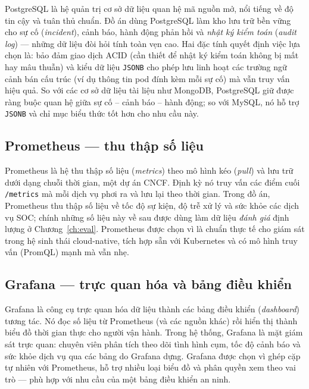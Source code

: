 PostgreSQL là hệ quản trị cơ sở dữ liệu quan hệ mã nguồn mở, nổi tiếng về độ tin cậy và
tuân thủ chuẩn. Đồ án dùng PostgreSQL làm kho lưu trữ bền vững cho sự cố
(\textit{incident}), cảnh báo, hành động phản hồi và \emph{nhật ký kiểm toán}
(\textit{audit log}) --- những dữ liệu đòi hỏi tính toàn vẹn cao. Hai đặc tính quyết định
việc lựa chọn là: bảo đảm giao dịch ACID (cần thiết để nhật ký kiểm toán không bị mất hay
mâu thuẫn) và kiểu dữ liệu \texttt{JSONB} cho phép lưu linh hoạt các trường ngữ cảnh bán
cấu trúc (ví dụ thông tin pod đính kèm mỗi sự cố) mà vẫn truy vấn hiệu quả. So với các cơ
sở dữ liệu tài liệu như MongoDB, PostgreSQL giữ được ràng buộc quan hệ giữa sự cố -- cảnh
báo -- hành động; so với MySQL, nó hỗ trợ \texttt{JSONB} và chỉ mục biểu thức tốt hơn cho
nhu cầu này.

\subsection{Prometheus --- thu thập số liệu}

Prometheus là hệ thu thập số liệu (\textit{metrics}) theo mô hình kéo (\textit{pull}) và
lưu trữ dưới dạng chuỗi thời gian, một dự án CNCF. Định kỳ nó truy vấn các điểm cuối
\texttt{/metrics} mà mỗi dịch vụ phơi ra và lưu lại theo thời gian. Trong đồ án, Prometheus
thu thập số liệu về tốc độ sự kiện, độ trễ xử lý và sức khỏe các dịch vụ SOC; chính những
số liệu này về sau được dùng làm dữ liệu \emph{đánh giá} định lượng ở Chương~\ref{ch:eval}.
Prometheus được chọn vì là chuẩn thực tế cho giám sát trong hệ sinh thái cloud-native, tích
hợp sẵn với Kubernetes và có mô hình truy vấn (PromQL) mạnh mà vẫn nhẹ.

\subsection{Grafana --- trực quan hóa và bảng điều khiển}

Grafana là công cụ trực quan hóa dữ liệu thành các bảng điều khiển (\textit{dashboard})
tương tác. Nó đọc số liệu từ Prometheus (và các nguồn khác) rồi hiển thị thành biểu đồ thời
gian thực cho người vận hành. Trong hệ thống, Grafana là mặt giám sát trực quan: chuyên
viên phân tích theo dõi tình hình cụm, tốc độ cảnh báo và sức khỏe dịch vụ qua các bảng do
Grafana dựng. Grafana được chọn vì ghép cặp tự nhiên với Prometheus, hỗ trợ nhiều loại biểu
đồ và phân quyền xem theo vai trò --- phù hợp với nhu cầu của một bảng điều khiển an ninh.

